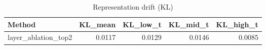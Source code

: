 \begin{table}[htbp]
\centering
\caption{Representation drift (KL)}
\label{tab:repr-drift}
\begin{tabular}{lrrrr}
\toprule
\textbf{Method} & \textbf{KL\_mean} & \textbf{KL\_low\_t} & \textbf{KL\_mid\_t} & \textbf{KL\_high\_t} \\
\midrule
layer\_ablation\_top2 & 0.0117 & 0.0129 & 0.0146 & 0.0085 \\
\bottomrule
\end{tabular}
\end{table}